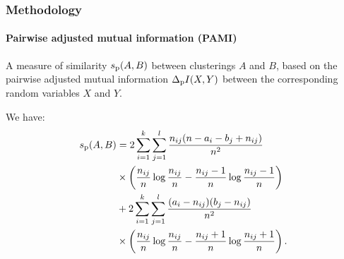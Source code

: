 \documentclass{tum-presentation}
\def\ip{\Delta_{\rm p}I}
\def\simp{s_{\rm p}}
\begin{document}
\begin{frame} 
	\frametitle{Methodology}
	\framesubtitle{Pairwise adjusted mutual information (PAMI)}
	
	A measure of similarity $\simp(A,B)$ between clusterings $A$ and $B$, based on  the pairwise adjusted mutual information $\ip(X,Y)$ between the corresponding random variables $X$ and $Y$. 
	
	\begin{theorem}\label{theo:pairsim}
		We have:
		\begin{align}\label{eq:pami}
		\begin{split}
		\simp(A,B) &=2 \sum_{i=1}^k \sum_{j=1}^l \frac{n_{ij}(n -a_i -b_j + n_{ij})}{n^2}\\
		&\times  \left(\frac{n_{ij}} n \log\frac{n_{ij}}n - \frac{n_{ij} - 1} n \log\frac{n_{ij} - 1}n\right)\\
		& + 2\sum_{i=1}^k \sum_{j=1}^l \frac{(a_i - n_{ij})(b_j - n_{ij})}{n^2}\\
		&\times\left(\frac{n_{ij}} n \log\frac{n_{ij}}n - \frac{n_{ij} + 1} n \log\frac{n_{ij} + 1}n \right).
		\end{split}
		\end{align}
	\end{theorem}
\end{frame}
\end{document}
